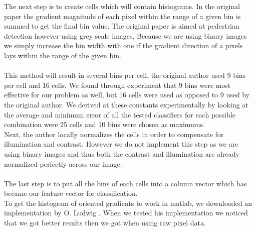 \documentclass[%
        compressed,
        final,
        notitlepage,
        narroweqnarray,
        inline,
        twoside,
        ]{ieee}
\begin{document}
The next step is to create cells which will contain histograms. In the original
paper the gradient magnitude of each pixel within the range of a given bin is
summed to get the final bin value. The original paper is aimed at pedestrian
detection however using grey scale images. Because we are using binary images we
simply increase the bin width with one if the gradient direction of a pixels lays within the range of the given bin.\\\\
This method will result in several bins per cell, the original author used 9
bins per cell and 16 cells. We found through experiment that 9 bins were most effective for
our problem as well, but 16 cells were used as opposed to 9 used by the original author.
We derived at these constants experimentally by looking at the average and
minimum error of all the tested classifiers for each possible combination were
25 cells and 10 bins were chosen as maximums. \\

Next, the author locally normalizes the cells in order to compensate for illumination and contrast. However we do not implement this step as we are using binary images and thus both the contrast and illumination are already normalized perfectly across our image.\\\\
The last step is to put all the bins of each cells into a column vector which
has became our feature vector for classification. \\

To get the histogram of oriented gradients to work in matlab, we downloaded an
implementation by O. Ludwig \cite{Ludwig}. When we tested his implementation
we noticed that we got better results then we got when using raw pixel data.
\end{document}
